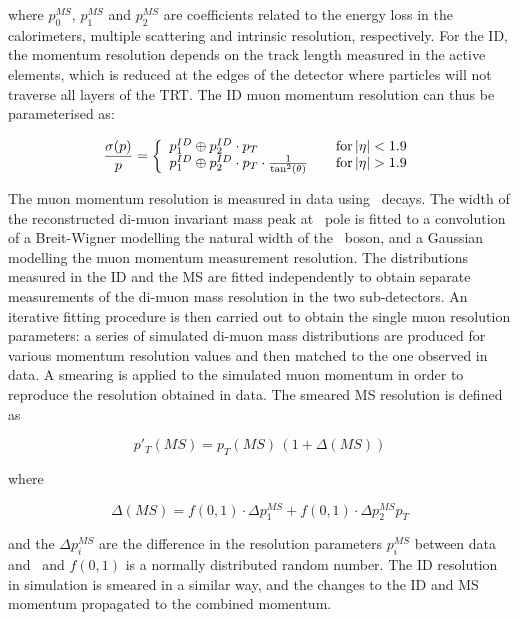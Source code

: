 where  $p_{0}^{MS}$, $p_{1}^{MS}$ and $p_{2}^{MS}$ are coefficients related to
the energy loss in the calorimeters, multiple scattering and intrinsic
resolution, respectively. For the ID, the momentum resolution depends on the track length
measured in the active elements, which is reduced at the edges of the
detector where particles will not traverse all layers of the TRT. The ID muon momentum resolution can thus be parameterised as:

\begin{equation}
\frac{ \sigma (p) }{ p } = \left\{
    \begin{array}{l l}
        p_{1}^{ID} \oplus  p_{2}^{ID} \cdot p_{T}  & \quad {\rm
for}\, \modetalt{1.9} \\
    p_{1}^{ID} \oplus  p_{2}^{ID} \cdot p_{T} \cdot
\frac{1}{\tan ^{2} (\theta)}  & \quad {\rm for}\, \modetagt{1.9} \\
  \end{array} \right.
\end{equation}

The muon momentum resolution is measured in data using \Zmm\ decays. The width
of the reconstructed di-muon invariant mass peak at \Z\ pole is fitted to a
convolution of a Breit-Wigner modelling the natural width of the \Z\ boson, and
a Gaussian modelling the muon momentum measurement resolution. The
distributions measured in the ID and the MS are fitted independently to obtain
separate measurements of the di-muon mass resolution in the two sub-detectors.
An iterative fitting procedure is then carried out to obtain the single muon
resolution parameters: a series of simulated di-muon mass distributions are produced for
various momentum resolution values and then matched to the one observed in data. 
A smearing is applied to the simulated muon momentum in order to reproduce the
resolution obtained in data. The smeared MS resolution is defined as

\begin{equation}
p'_{T}(MS) = p_{T}(MS)\, (1+\Delta(MS))
\end{equation}

 where 

\begin{equation}
\Delta(MS) = f(0,1) \cdot \Delta p_{1}^{MS} +  f(0,1) \cdot \Delta p_{2}^{MS} p_{T}
\end{equation}

and the $ \Delta p_{i}^{MS} $ are the difference in the resolution parameters $
p_{i}^{MS} $ between data and \mcsim\ and $f(0,1)$ is a normally distributed
random number.  The ID resolution in simulation is
smeared in a similar way, and the changes to the ID and MS momentum propagated
to the combined momentum.


